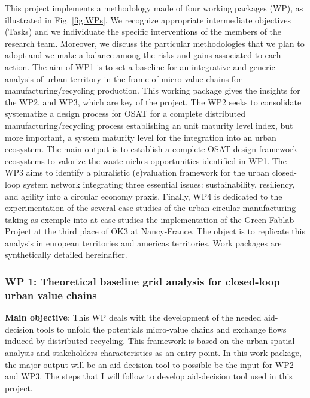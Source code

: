 \documentclass[
  12pt,
  a4paperpaper,
  onecolumn]{article}
\begin{document}
This project implements a methodology made of four working packages
(WP), as illustrated in Fig. \ref{fig:WPs}. We recognize appropriate
intermediate objectives (Tasks) and we individuate the specific
interventions of the members of the research team. Moreover, we discuss
the particular methodologies that we plan to adopt and we make a balance
among the risks and gains associated to each action. The aim of WP1 is
to set a baseline for an integrative and generic analysis of urban
territory in the frame of micro-value chains for manufacturing/recycling
production. This working package gives the insights for the WP2, and
WP3, which are key of the project. The WP2 seeks to consolidate
systematize a design process for OSAT for a complete distributed
manufacturing/recycling process establishing an unit maturity level
index, but more important, a system maturity level for the integration
into an urban ecosystem. The main output is to establish a complete OSAT
design framework ecosystems to valorize the waste niches opportunities
identified in WP1. The WP3 aims to identify a pluralistic (e)valuation
framework for the urban closed-loop system network integrating three
essential issues: sustainability, resiliency, and agility into a
circular economy praxis. Finally, WP4 is dedicated to the
experimentation of the several case studies of the urban circular
manufacturing taking as exemple into at case studies the implementation
of the Green Fablab Project at the third place of OK3 at Nancy-France.
The object is to replicate this analysis in european territories and
americas territories. Work packages are synthetically detailed
hereinafter.

\hypertarget{wp-1-theoretical-baseline-grid-analysis-for-closed-loop-urban-value-chains}{%
\subsubsection{WP 1: Theoretical baseline grid analysis for closed-loop
urban value
chains}\label{wp-1-theoretical-baseline-grid-analysis-for-closed-loop-urban-value-chains}}

\textbf{Main objective}: This WP deals with the development of the
needed aid-decision tools to unfold the potentials micro-value chains
and exchange flows induced by distributed recycling. This framework is
based on the urban spatial analysis and stakeholders characteristics as
an entry point. In this work package, the major output will be an
aid-decision tool to possible be the input for WP2 and WP3. The steps
that I will follow to develop aid-decision tool used in this project.
\end{document}
